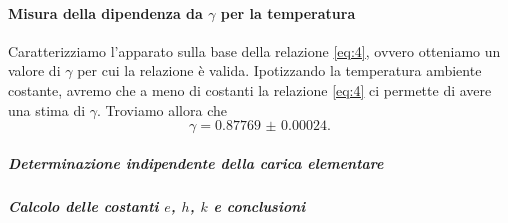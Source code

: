 \documentclass[a4paper, varvw, nofootinbib]{revtex4-2}
\begin{document}
\paragraph*{Misura della dipendenza da $\gamma$ per la temperatura} Caratterizziamo l'apparato sulla base della relazione \eqref{eq:4}, ovvero otteniamo un valore di $\gamma$ per cui la relazione è valida. Ipotizzando la temperatura ambiente costante, avremo che a meno di costanti la relazione \eqref{eq:4} ci permette di avere una stima di $\gamma$. Troviamo allora che \[\gamma = \num{0.87769(24)}.\]

\paragraph*{}


\subparagraph*{Determinazione indipendente della carica elementare}\label{sec:millikan} 

\subparagraph*{Calcolo delle costanti $e$, $h$, $k$ e conclusioni}\label{sec:combined_data}


\end{document}
